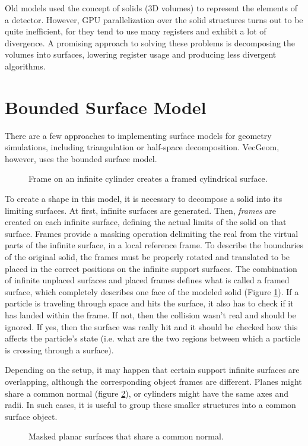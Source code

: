 \documentclass[12pt, a4paper]{article}
\begin{document}
Old models used the concept of solids (3D volumes) to represent the elements of a detector. However, GPU parallelization over the solid structures turns out to be quite inefficient, for they tend to use many registers and exhibit a lot of divergence. A promising approach to solving these problems is decomposing the volumes into surfaces, lowering register usage and producing less divergent algorithms.


\section{Bounded Surface Model}

There are a few approaches to implementing surface models for geometry simulations, including triangulation or half-space decomposition. VecGeom, however, uses the bounded surface model.
\begin{figure}[h!]
	\centering
	
	\caption{Frame on an infinite cylinder creates a framed cylindrical surface.}
	\label{fig:mask}
\end{figure}

To create a shape in this model, it is necessary to decompose a solid into its limiting surfaces. At first, infinite surfaces are generated. Then, \textit{frames} are created on each infinite surface, defining the actual limits of the solid on that surface. Frames provide a masking operation delimiting the real from the virtual parts of the infinite surface, in a local reference frame. To describe the boundaries of the original solid, the frames must be properly rotated and translated to be placed in the correct positions on the infinite support surfaces. The combination of infinite unplaced surfaces and placed frames defines what is called a framed surface, which completely describes one face of the modeled solid (Figure \ref{fig:mask}). If a particle is traveling through space and hits the surface, it also has to check if it has landed within the frame. If not, then the collision wasn't real and should be ignored. If yes, then the surface was really hit and it should be checked how this affects the particle's state (i.e. what are the two regions between which a particle is crossing through a surface).

Depending on the setup, it may happen that certain support infinite surfaces are overlapping, although the corresponding object frames are different. Planes might share a common normal (figure \ref{fig:commonSurf}), or cylinders might have the same axes and radii. In such cases, it is useful to group these smaller structures into a common surface object.
\begin{figure}[h!]
	\centering
	
	\caption{Masked planar surfaces that share a common normal.}
	\label{fig:commonSurf}
\end{figure}
\end{document}
